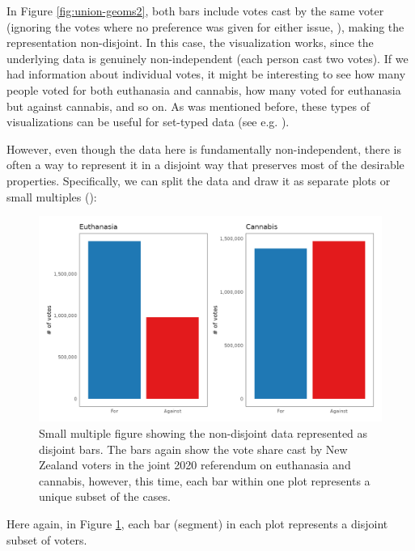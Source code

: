 \documentclass[
]{book}
\theoremstyle{definition}
\theoremstyle{definition}
\theoremstyle{definition}
\theoremstyle{definition}
\theoremstyle{remark}
\begin{document}
In Figure \ref{fig:union-geoms2}, both bars include votes cast by the same voter (ignoring the votes where no preference was given for either issue, ), making the representation non-disjoint. In
this case, the visualization works, since the underlying data is genuinely non-independent (each person cast two votes). If we had information about individual votes, it might be interesting to see how many people voted for both euthanasia and cannabis, how many voted for euthanasia but against cannabis, and so on. As was mentioned before, these types of visualizations can be useful for set-typed data (see e.g. ).

However, even though the data here is fundamentally non-independent, there is often a way to represent it in a disjoint way that preserves most of the desirable properties. Specifically, we can split the data and draw it as separate plots or small multiples ():

\begin{figure}

{\centering \includegraphics[width=1\linewidth,height=1\textheight]{./figures/referendum-bijection} 

}

\caption{Small multiple figure showing the non-disjoint data represented as disjoint bars. The bars again show the vote share cast by New Zealand voters in the joint 2020 referendum on euthanasia and cannabis, however, this time, each bar within one plot represents a unique subset of the cases.}\label{fig:small-multiples}
\end{figure}

Here again, in Figure \ref{fig:small-multiples}, each bar (segment) in each plot represents a disjoint subset of voters.
\end{document}
